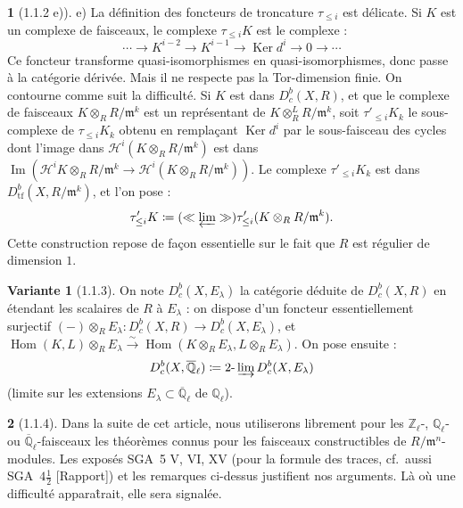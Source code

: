 \documentclass[12pt,a4paper]{article}
\theoremstyle{plain}
\theoremstyle{definition}
\newtheorem{var}[theorem]{Variante}
\theoremstyle{definition}
\newtheorem{para}{}[section]
\theoremstyle{remark}
\DeclareMathOperator{\Hom}{Hom}
\DeclareMathOperator{\Imm}{Im}
\DeclareMathOperator{\Ker}{Ker}
\newcommand{\limind}{\varinjlim}
\newcommand{\limproj}{\varprojlim}
\begin{document}
\begin{para}[1.1.2 e)]
e) La d\'efinition des foncteurs de troncature $\tau_{\leq i}$ est d\'elicate. Si $K$ est un complexe de faisceaux, le complexe $\tau_{\leq i} K$ est le complexe :
\[\cdots \to K^{i-2} \to K^{i-1} \to \Ker d^i \to 0 \to \cdots\]
Ce foncteur transforme quasi-isomorphismes en quasi-isomorphismes, donc passe \`a la cat\'egorie d\'eriv\'ee. Mais il ne respecte pas la Tor-dimension finie. On contourne comme suit la difficult\'e. Si $K$ est dans $D^b_c(X, R)$, et que le complexe de faisceaux $K \otimes_R R/\mathfrak{m}^k$ est un repr\'esentant de $K \otimes^L_R R/\mathfrak{m}^k$, soit $\tau'_{\leq i} K_k$ le sous-complexe de $\tau_{\leq i} K_k$ obtenu en rempla\c cant $\Ker d^i$ par le sous-faisceau des cycles dont l'image dans $\mathscr{H}^i(K \otimes_R R/\mathfrak{m}^k)$ est dans $\Imm(\mathscr{H}^i K \otimes_R R/\mathfrak{m}^k \to \mathscr{H}^i(K \otimes_R R/\mathfrak{m}^k))$. Le complexe $\tau'_{\leq i} K_k$ est dans $D^b_{\text{tf}}(X, R/\mathfrak{m}^k)$, et l'on pose :
\[\tau'_{\leq i} K \coloneqq (\ll \limproj \gg) \tau'_{\leq i}(K \otimes_R R/\mathfrak{m}^k).\]
Cette construction repose de fa\c con essentielle sur le fait que $R$ est r\'egulier de dimension $1$.
\end{para}

\begin{var}[1.1.3]
On note $D^b_c(X, E_\lambda)$ la cat\'egorie d\'eduite de $D^b_c(X, R)$ en \'etendant les scalaires de $R$ \`a $E_\lambda$ : on dispose d'un foncteur essentiellement surjectif $(-) \otimes_R E_\lambda : D^b_c(X, R) \to D^b_c(X, E_\lambda)$, et $\Hom(K, L) \otimes_R E_\lambda \xrightarrow{\sim} \Hom(K \otimes_R E_\lambda, L \otimes_R E_\lambda)$. On pose ensuite :
\[D^b_c(X, \overline{\mathbb{Q}}_\ell) \coloneqq 2\text{-}\limind D^b_c(X, E_\lambda)\]
(limite sur les extensions $E_\lambda \subset \overline{\mathbb{Q}}_\ell$ de $\mathbb{Q}_\ell$).
\end{var}

\begin{para}[1.1.4]
Dans la suite de cet article, nous utiliserons librement pour les $\mathbb{Z}_\ell$-, $\mathbb{Q}_\ell$- ou $\overline{\mathbb{Q}}_\ell$-faisceaux les th\'eor\`emes connus pour les faisceaux constructibles de $R/\mathfrak{m}^n$-modules. Les expos\'es SGA~5 V, VI, XV (pour la formule des traces, cf.~aussi SGA~$4\frac{1}{2}$ [Rapport]) et les remarques ci-dessus justifient nos arguments. L\`a o\`u une difficult\'e appara\^trait, elle sera signal\'ee.
\end{para}
\end{document}
